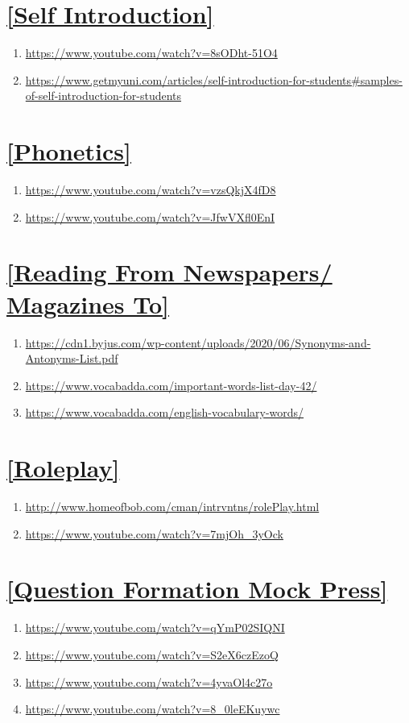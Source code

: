 \appendix

\section{\autoref{Self Introduction}}
\begin{enumerate}
    \item \url{https://www.youtube.com/watch?v=8sODht-51O4}
    \item \url{https://www.getmyuni.com/articles/self-introduction-for-students#samples-of-self-introduction-for-students}
\end{enumerate}

\section{\autoref{Phonetics}}
\begin{enumerate}
    \item \url{https://www.youtube.com/watch?v=vzsQkjX4fD8}
    \item \url{https://www.youtube.com/watch?v=JfwVXfl0EnI}
\end{enumerate}

\section{\autoref{Reading From Newspapers/ Magazines To}}
\begin{enumerate}
    \item \url{https://cdn1.byjus.com/wp-content/uploads/2020/06/Synonyms-and-Antonyms-List.pdf}
    \item \url{https://www.vocabadda.com/important-words-list-day-42/}
    \item \url{https://www.vocabadda.com/english-vocabulary-words/}
\end{enumerate}

\section{\autoref{Roleplay}}
\begin{enumerate}
    \item \url{http://www.homeofbob.com/cman/intrvntns/rolePlay.html}
    \item \url{https://www.youtube.com/watch?v=7mjOh_3yOck}
\end{enumerate}

\section{\autoref{Question Formation Mock Press}}
\begin{enumerate}
    \item \url{https://www.youtube.com/watch?v=qYmP02SIQNI}
    \item \url{https://www.youtube.com/watch?v=S2eX6czEzoQ}
    \item \url{https://www.youtube.com/watch?v=4yvaOl4c27o}
    \item \url{https://www.youtube.com/watch?v=8_0leEKuywc}
\end{enumerate}

\clearpage